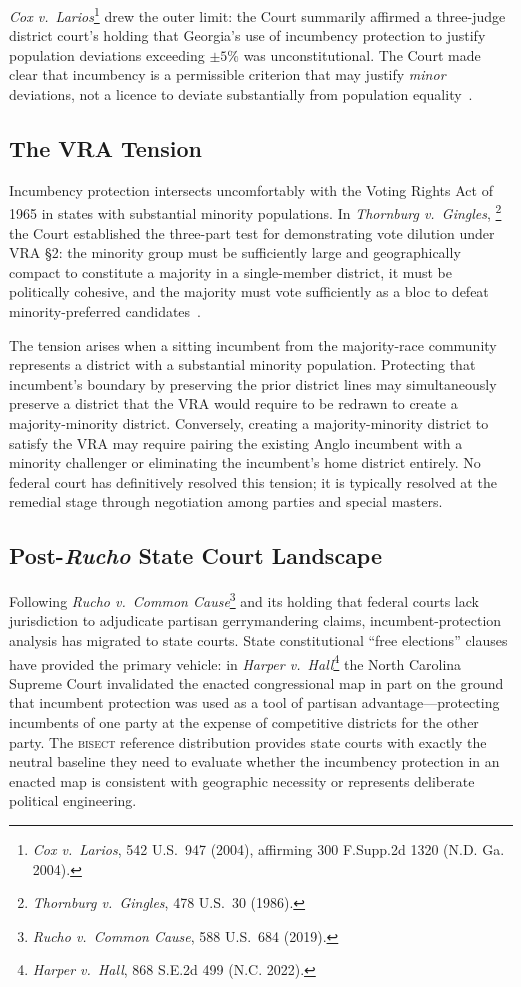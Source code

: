 \textit{Cox v.\ Larios}\footnote{\textit{Cox v.\ Larios}, 542 U.S.\ 947 (2004),
affirming 300 F.Supp.2d 1320 (N.D. Ga. 2004).} drew the outer limit: the Court
summarily affirmed a three-judge district court's holding that Georgia's use of
incumbency protection to justify population deviations exceeding $\pm 5\%$ was
unconstitutional. The Court made clear that incumbency is a permissible criterion
that may justify \textit{minor} deviations, not a licence to deviate substantially
from population equality~\citep{cox2004}.

\subsection{The VRA Tension}

Incumbency protection intersects uncomfortably with the Voting Rights Act of 1965 in
states with substantial minority populations. In \textit{Thornburg v.\ Gingles},
\footnote{\textit{Thornburg v.\ Gingles}, 478 U.S.\ 30 (1986).} the Court established
the three-part test for demonstrating vote dilution under VRA \S{}2: the minority group
must be sufficiently large and geographically compact to constitute a majority in a
single-member district, it must be politically cohesive, and the majority must vote
sufficiently as a bloc to defeat minority-preferred candidates~\citep{gingles1986}.

The tension arises when a sitting incumbent from the majority-race community represents
a district with a substantial minority population. Protecting that incumbent's boundary
by preserving the prior district lines may simultaneously preserve a district that the
VRA would require to be redrawn to create a majority-minority district. Conversely,
creating a majority-minority district to satisfy the VRA may require pairing the existing
Anglo incumbent with a minority challenger or eliminating the incumbent's home district
entirely. No federal court has definitively resolved this tension; it is typically
resolved at the remedial stage through negotiation among parties and special masters.

\subsection{Post-\textit{Rucho} State Court Landscape}

Following \textit{Rucho v.\ Common Cause}\footnote{\textit{Rucho v.\ Common Cause},
588 U.S.\ 684 (2019).} and its holding that federal courts lack jurisdiction to adjudicate
partisan gerrymandering claims, incumbent-protection analysis has migrated to state courts.
State constitutional ``free elections'' clauses have provided the primary vehicle: in
\textit{Harper v.\ Hall}\footnote{\textit{Harper v.\ Hall}, 868 S.E.2d 499 (N.C. 2022).}
the North Carolina Supreme Court invalidated the enacted congressional map in part on
the ground that incumbent protection was used as a tool of partisan advantage---protecting
incumbents of one party at the expense of competitive districts for the other party. The
\textsc{bisect} reference distribution provides state courts with exactly the neutral
baseline they need to evaluate whether the incumbency protection in an enacted map is
consistent with geographic necessity or represents deliberate political engineering.
